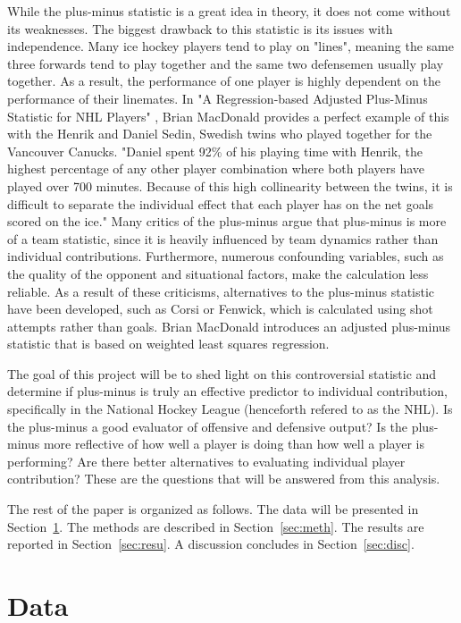 \documentclass[12pt]{article}
\begin{document}
While the plus-minus statistic is a great idea in theory, it does not come without its weaknesses. The biggest drawback to this
statistic is its issues with independence. Many ice hockey players tend to play on "lines", meaning the same three 
forwards tend to play together and the same two defensemen usually play together. As a result, the performance of one player is highly dependent 
on the performance of their linemates. In "A Regression-based Adjusted Plus-Minus Statistic for NHL Players" \cite{Macdonald_2011}, Brian
MacDonald provides a perfect example of this with the Henrik and Daniel Sedin, Swedish twins who played together for the Vancouver Canucks. 
"Daniel spent 92\% of his playing time with Henrik, the highest percentage of any other player combination where both players have
played over 700 minutes. Because of this high collinearity between the twins, it is difficult to separate the individual effect that each 
player has on the net goals scored on the ice."\cite{Macdonald_2012} Many critics of the plus-minus argue that plus-minus is more of a team 
statistic, since it is heavily influenced by team dynamics rather than individual contributions. Furthermore, numerous confounding variables, 
such as the quality of the opponent and situational factors, make the calculation less reliable. As a result of these criticisms, alternatives 
to the plus-minus statistic have been developed, such as Corsi or Fenwick, which is calculated using shot attempts rather than goals. Brian 
MacDonald introduces an adjusted plus-minus statistic that is based on weighted least squares regression\cite{Macdonald_2012}.

The goal of this project will be to shed light on this controversial statistic and determine if plus-minus is truly an effective predictor
to individual contribution, specifically in the National Hockey League (henceforth refered to as the NHL). Is the plus-minus a good evaluator 
of offensive and defensive output? Is the plus-minus more reflective of how well a player is doing than how well a player is performing? 
Are there better alternatives to evaluating individual player contribution? These are the questions that will be answered from this analysis.


The rest of the paper is organized as follows.
The data will be presented in Section~\ref{sec:data}.
The methods are described in Section~\ref{sec:meth}.
The results are reported in Section~\ref{sec:resu}.
A discussion concludes in Section~\ref{sec:disc}.


\section{Data}
\label{sec:data}
\end{document}
